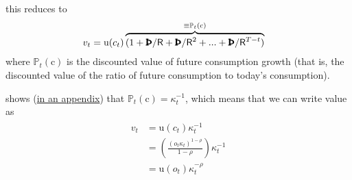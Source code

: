 \documentclass{scrartcl}
\begin{document}
this reduces to  \hypertarget{vFuncAnalytical}{}
\begin{equation}\begin{gathered}\begin{aligned}
  v_{t} &=  \mathrm{u}(c_{t})\overbrace{(1+\text{\pmb{\Thorn}}/{\mathsf{R}}+\text{\pmb{\Thorn}}/{\mathsf{R}}^{2}+...+\text{\pmb{\Thorn}}/{\mathsf{R}}^{T-t})}^{\equiv {\mathbb{P}}_{t}(\mathrm{c})} \label{eq:vFuncAnalytical}
\end{aligned}\end{gathered}\end{equation}
where ${\mathbb{P}}_{t}(\mathrm{c})$ is the discounted value of future consumption growth (that is, the discounted value of the ratio of future consumption to today's consumption).


\cite{BufferStockTheory} shows (\href{https://www.econ2.jhu.edu/people/ccarroll/papers/BufferStockTheory/#MPCnvrsIsCPDV}{in an appendix}) that ${\mathbb{P}}_{t}(\mathrm{c}) = \kappa_{t}^{-1}$, which means that we can write value as
\begin{equation}\begin{gathered}\begin{aligned}
  v_{t} & =  \mathrm{u}(c_{t})\kappa^{-1}_{t}
  \\ & =  \left(\frac{(o_{t}\kappa_{t})^{1-\rho}}{1-\rho}\right)\kappa_{t}^{-1}
\\ & =  \mathrm{u}(o_{t})\kappa_{t}^{-\rho}           
\end{aligned}\end{gathered}\end{equation}



\end{document}
